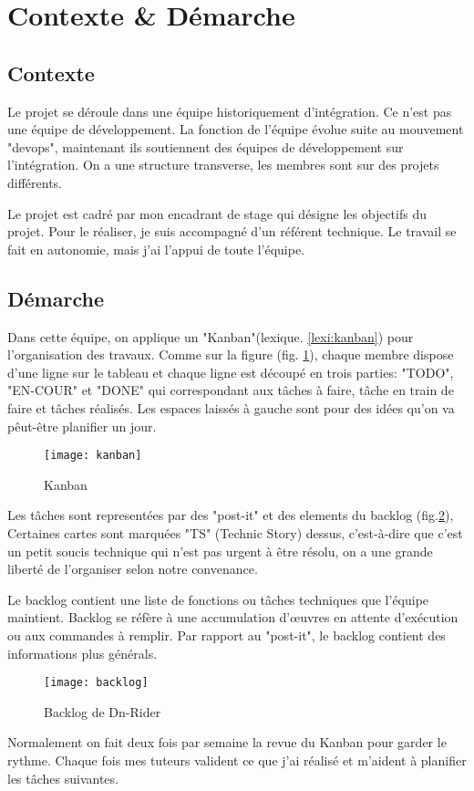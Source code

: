 \section{Contexte \& Démarche}
\subsection{Contexte}
Le projet se déroule dans une équipe historiquement d'intégration. Ce n'est pas une équipe de développement.
La fonction de l'équipe évolue suite au mouvement "devops", maintenant ils soutiennent des équipes de développement sur l'intégration.
On a une structure transverse, les membres sont sur des projets différents.

Le projet est cadré par mon encadrant de stage qui désigne les objectifs du projet.
Pour le réaliser, je suis accompagné d'un référent technique.
Le travail se fait en autonomie, mais j'ai l'appui de toute l'équipe.

\subsection{Démarche}
Dans cette équipe, on applique un "Kanban"(lexique. \ref{lexi:kanban}) pour l'organisation des travaux.
Comme sur la figure (fig. \ref{fig:kanban}), chaque membre dispose d'une ligne sur le tableau et chaque ligne est découpé en trois parties: "TODO", "EN-COUR" et "DONE" qui correspondant aux tâches à faire, tâche en train de faire et tâches réalisés.
Les espaces laissés à gauche sont pour des idées qu'on va pêut-être planifier un jour.

\begin{figure}[ht]
\centering
\texttt{[image: kanban]}
\caption{Kanban}
\label{fig:kanban}
\end{figure}

Les tâches sont representées par des "post-it" et des elements du backlog (fig.\ref{fig:backlog}),
Certaines cartes sont marquées "TS" (Technic Story) dessus, c'est-à-dire que c'est un petit soucis technique qui n'est pas urgent à être résolu,
on a une grande liberté de l'organiser selon notre convenance.

Le backlog contient une liste de fonctions ou tâches techniques que l'équipe maintient.
Backlog se réfère à une accumulation d'œuvres en attente d'exécution ou aux commandes à remplir.
Par rapport au "post-it", le backlog contient des informations plus générals.

\begin{figure}[ht]
 \centering
 \texttt{[image: backlog]}
 \caption{Backlog de Dn-Rider}
 \label{fig:backlog}
\end{figure}

Normalement on fait  deux fois par semaine la revue du Kanban pour garder le rythme.
Chaque fois mes tuteurs valident ce que j'ai réalisé et m'aident à planifier les tâches suivantes.

\clearpage
